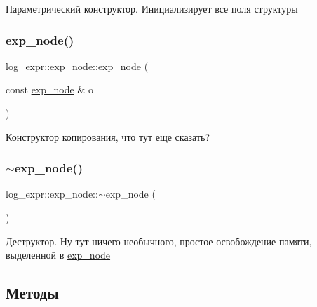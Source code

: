 Параметрический конструктор. Инициализирует все поля структуры \mbox{\label{structlog__expr_1_1exp__node_a5623e5c9930141dcbcd6cd17e27dba75}} 
\subsubsection{\texorpdfstring{exp\+\_\+node()}{exp\_node()}\hspace{0.1cm}{\footnotesize\ttfamily [2/2]}}
{\footnotesize\ttfamily log\+\_\+expr\+::exp\+\_\+node\+::exp\+\_\+node (\begin{DoxyParamCaption}\item[{const \hyperlink{structlog__expr_1_1exp__node}{exp\+\_\+node} \&}]{o }\end{DoxyParamCaption})}

Конструктор копирования, что тут еще сказать? \mbox{\label{structlog__expr_1_1exp__node_a9231ce2eec4af8f88a70e802b65c33fd}} 
\subsubsection{\texorpdfstring{$\sim$exp\+\_\+node()}{~exp\_node()}}
{\footnotesize\ttfamily log\+\_\+expr\+::exp\+\_\+node\+::$\sim$exp\+\_\+node (\begin{DoxyParamCaption}{ }\end{DoxyParamCaption})}

Деструктор. Ну тут ничего необычного, простое освобождение памяти, выделенной в \hyperlink{structlog__expr_1_1exp__node}{exp\+\_\+node} 

\subsection{Методы}
\mbox{\label{structlog__expr_1_1exp__node_a4c3f2d69a3f9f402c6dff04f5e1798e0}} 
